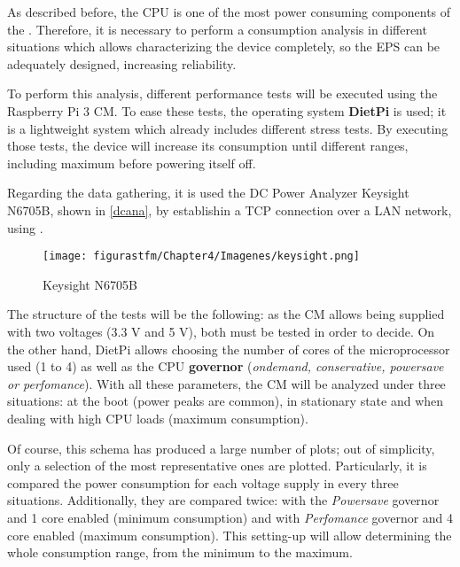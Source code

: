 As described before, the \acrshort{CPU} is one of the most power consuming components of the . Therefore, it is necessary to perform a consumption analysis in different situations which allows characterizing the device completely, so the \acrshort{EPS} can be adequately designed, increasing reliability. 

To perform this analysis, different performance tests will be executed using the Raspberry Pi 3 CM. To ease these tests, the operating system \textbf{DietPi} \cite{diet} is used; it is a lightweight system which already includes different stress tests. By executing those tests, the device will increase its consumption until different ranges, including maximum before powering itself off. 

Regarding the data gathering, it is used the DC Power Analyzer Keysight N6705B, shown in \autoref{dcana}, by establishin a \acrshort{TCP} connection over a \acrshort{LAN} network, using .

\begin{figure} [H]
			\centering
			\texttt{[image: figurastfm/Chapter4/Imagenes/keysight.png]}
			\caption{Keysight N6705B \cite{agilent}} \label{dcana}
\end{figure}



The structure of the tests will be the following: as the CM allows being supplied with two voltages (3.3 V and 5 V), both must be tested in order to decide. On the other hand, DietPi allows choosing the number of cores of the microprocessor used (1 to 4) as well as the CPU \textbf{governor} (\textit{ondemand, conservative, powersave or perfomance}). With all these parameters, the CM will be analyzed under three situations: at the boot (power peaks are common), in stationary state and when dealing with high CPU loads (maximum consumption).

Of course, this schema has produced a large number of plots; out of simplicity, only a selection of the most representative ones are plotted. Particularly, it is compared the power consumption for each voltage supply in every three situations. Additionally, they are compared twice: with the \textit{Powersave} governor and 1 core enabled (minimum consumption) and with \textit{Perfomance} governor and 4 core enabled (maximum consumption). This setting-up will allow determining the whole consumption range, from the minimum to the maximum.


